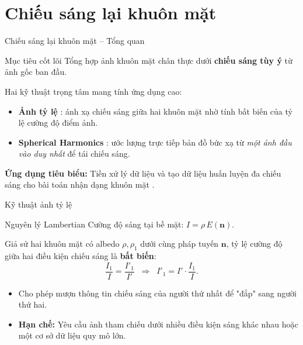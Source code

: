 
\section{Chiếu sáng lại khuôn mặt}

\begin{frame}{Chiếu sáng lại khuôn mặt -- Tổng quan}
    \begin{block}{Mục tiêu cốt lõi}
        Tổng hợp ảnh khuôn mặt chân thực dưới \textbf{chiếu sáng tùy ý} từ ảnh gốc ban đầu.
    \end{block}

    \vspace{0.5cm}
    Hai kỹ thuật trọng tâm mang tính ứng dụng cao:
    \begin{itemize}
        \item \textbf{Ảnh tỷ lệ} \cite{riklin2001quotient}: ánh xạ chiếu sáng giữa hai khuôn mặt nhờ tính bất biến của tỷ lệ cường độ điểm ảnh.
        \item \textbf{Spherical Harmonics} \cite{wen2003face}: ước lượng trực tiếp bản đồ bức xạ từ \textit{một ảnh đầu vào duy nhất} để tái chiếu sáng.
    \end{itemize}

    \vspace{0.3cm}
    \textbf{Ứng dụng tiêu biểu:} Tiền xử lý dữ liệu và tạo dữ liệu huấn luyện đa chiếu sáng cho bài toán nhận dạng khuôn mặt \cite{qing2004face}.
\end{frame}

\begin{frame}{Kỹ thuật ảnh tỷ lệ}
    \begin{block}{Nguyên lý Lambertian}
        Cường độ sáng tại bề mặt: $I = \rho\, E(\mathbf{n})$.
    \end{block}

    \vspace{0.3cm}
    Giả sử hai khuôn mặt có albedo $\rho, \rho_1$ dưới cùng pháp tuyến $\mathbf{n}$, tỷ lệ cường độ giữa hai điều kiện chiếu sáng là \textbf{bất biến}:
    \begin{equation}
        \frac{I_1}{I} = \frac{I'_1}{I'}
        \;\;\Longrightarrow\;\;
        I'_1 = I' \cdot \frac{I_1}{I}.
    \end{equation}

    \vspace{0.3cm}
    \begin{itemize}
        \item Cho phép mượn thông tin chiếu sáng của người thứ nhất để "đắp" sang người thứ hai.
        \item \textbf{Hạn chế:} Yêu cầu ảnh tham chiếu dưới nhiều điều kiện sáng khác nhau hoặc một cơ sở dữ liệu quy mô lớn.
    \end{itemize}
\end{frame}

